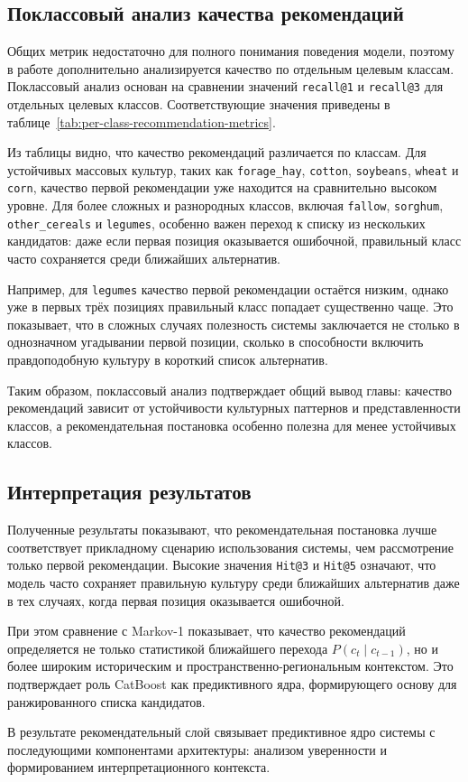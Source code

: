 \subsection{Поклассовый анализ качества рекомендаций}

Общих метрик недостаточно для полного понимания поведения модели, поэтому в работе дополнительно анализируется качество по отдельным целевым классам. Поклассовый анализ основан на сравнении значений \texttt{recall@1} и \texttt{recall@3} для отдельных целевых классов. Соответствующие значения приведены в таблице~\ref{tab:per-class-recommendation-metrics}.



Из таблицы видно, что качество рекомендаций различается по классам. Для устойчивых массовых культур, таких как
\texttt{forage\_hay}, \texttt{cotton}, \texttt{soybeans}, \texttt{wheat} и \texttt{corn}, качество первой рекомендации
уже находится на сравнительно высоком уровне. Для более сложных и разнородных классов, включая \texttt{fallow},
\texttt{sorghum}, \texttt{other\_cereals} и \texttt{legumes}, особенно важен переход к списку из нескольких кандидатов:
даже если первая позиция оказывается ошибочной, правильный класс часто сохраняется среди ближайших альтернатив.

Например, для \texttt{legumes} качество первой рекомендации остаётся низким, однако уже в первых трёх позициях
правильный класс попадает существенно чаще. Это показывает, что в сложных случаях полезность системы заключается не
столько в однозначном угадывании первой позиции, сколько в способности включить правдоподобную культуру в короткий
список альтернатив.

Таким образом, поклассовый анализ подтверждает общий вывод главы: качество рекомендаций зависит от устойчивости
культурных паттернов и представленности классов, а рекомендательная постановка особенно полезна для менее устойчивых
классов.

\subsection{Интерпретация результатов}

Полученные результаты показывают, что рекомендательная постановка лучше соответствует прикладному сценарию использования
системы, чем рассмотрение только первой рекомендации. Высокие значения \texttt{Hit@3} и \texttt{Hit@5} означают, что
модель часто сохраняет правильную культуру среди ближайших альтернатив даже в тех случаях, когда первая позиция
оказывается ошибочной.

При этом сравнение с Markov-1 показывает, что качество рекомендаций определяется не только статистикой ближайшего
перехода \(P(c_t \mid c_{t-1})\), но и более широким историческим и пространственно-региональным контекстом. Это
подтверждает роль CatBoost как предиктивного ядра, формирующего основу для ранжированного списка кандидатов.

В результате рекомендательный слой связывает предиктивное ядро системы с последующими компонентами архитектуры:
анализом уверенности и формированием интерпретационного контекста.
